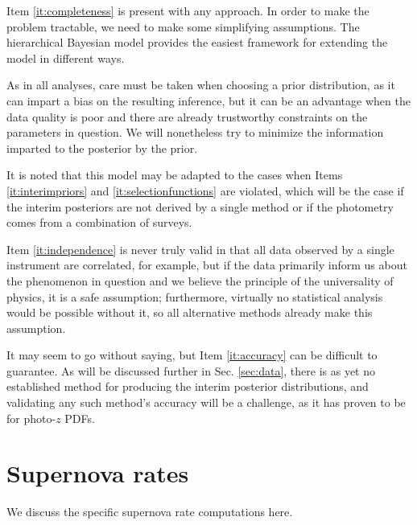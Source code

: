 \documentclass[12pt, twocolumn]{emulateapj}
\begin{document}
\begin{appendix}
Item \ref{it:completeness} is present with any approach. In order to make the problem tractable, we need to make some simplifying assumptions. 
The hierarchical Bayesian model provides the easiest framework for extending the model in different ways. 


As in all analyses, care must be taken when choosing a prior distribution, as it can impart a bias on the resulting inference, but it can be an advantage when the data quality is poor and there are already trustworthy constraints on the parameters in question.  
We will nonetheless try to minimize the information imparted to the posterior by the prior.



It is noted that this model may be adapted to the cases when Items \ref{it:interimpriors} and \ref{it:selectionfunctions} are violated, which will be the case if the interim posteriors are not derived by a single method or if the photometry comes from a combination of surveys.  

Item \ref{it:independence} is never truly valid in that all data observed by a single instrument are correlated, for example, but if the data primarily inform us about the phenomenon in question and we believe the principle of the universality of physics, it is a safe assumption; furthermore, virtually no statistical analysis would be possible without it, so all alternative methods already make this assumption.

It may seem to go without saying, but Item \ref{it:accuracy} can be difficult to guarantee.  
As will be discussed further in Sec. \ref{sec:data}, there is as yet no established method for producing the interim posterior distributions, and validating any such method's accuracy will be a challenge, as it has proven to be for photo-$z$ PDFs.

\section{Supernova rates}
We discuss the specific supernova rate computations here.



\end{appendix}
\end{document}
